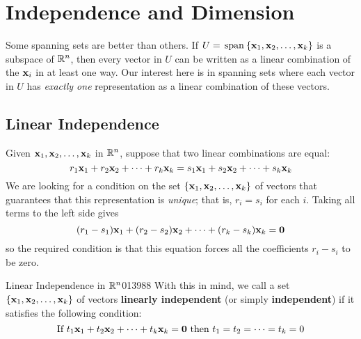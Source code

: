 \newpage
\section{Independence and Dimension}
\label{sec:5_2}

Some spanning sets are better than others. If $U = \thinspace\operatorname{span\medspace}\{\textbf{x}_{1}, \textbf{x}_{2}, \dots, \textbf{x}_{k}\}$ is a subspace of $\mathbb{R}^n$, then every vector in $U$ can be written as a linear combination of the $\textbf{x}_{i}$ in at least one way. Our interest here is in spanning sets where each vector in $U$ has \textit{exactly one} representation as a linear combination of these vectors.

\subsection*{Linear Independence}

Given $\textbf{x}_{1}, \textbf{x}_{2}, \dots, \textbf{x}_{k}$ in $\mathbb{R}^n$, suppose that two linear combinations are equal:
\begin{equation*}
r_1\textbf{x}_1 + r_2\textbf{x}_2 + \dots + r_k\textbf{x}_k = s_1\textbf{x}_1 + s_2\textbf{x}_2 + \dots + s_k\textbf{x}_k
\end{equation*}
We are looking for a condition on the set $\{\textbf{x}_{1}, \textbf{x}_{2}, \dots, \textbf{x}_{k}\}$ of vectors that guarantees that this representation is \textit{unique}; that is, $r_{i} = s_{i}$ for each $i$. Taking all terms to the left side gives
\begin{equation*}
(r_1 - s_1)\textbf{x}_1 + (r_2 - s_2)\textbf{x}_2 + \dots + (r_k - s_k)\textbf{x}_k = \textbf{0}
\end{equation*}
so the required condition is that this equation forces all the coefficients $r_{i} - s_{i}$ to be zero.

\begin{definition}{Linear Independence in $\mathbb{R}^n$}{013988}
With this in mind, we call a set $\{\textbf{x}_{1}, \textbf{x}_{2}, \dots, \textbf{x}_{k}\}$ of vectors \textbf{linearly independent} (or simply \textbf{independent}) if it satisfies the following condition:
\begin{equation*}
\mbox{If } t_1\textbf{x}_1 + t_2\textbf{x}_2 + \dots + t_k\textbf{x}_k = \textbf{0} \mbox{ then } t_1 = t_2 = \dots = t_k = 0
\end{equation*}
\end{definition}

